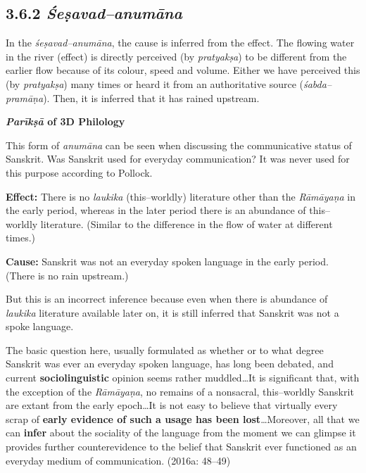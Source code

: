 
\vspace{-.3cm}

\subsection*{3.6.2 {\it {\bfseries Śeṣavad–anumāna}}}

\vspace{-.3cm}

In the \textit{śeṣavad–anumāna}, the cause is inferred from the effect. The flowing water in the river (effect) is directly perceived (by \textit{pratyakṣa}) to be different from the earlier flow because of its colour, speed and volume. Either we have perceived this (by \textit{pratyakṣa}) many times or heard it from an authoritative source (\textit{śabda–pramāṇa}). Then, it is inferred that it has rained upstream.

\textbf{\textit{Parīkṣā} of 3D Philology}

This form of \textit{anumāna} can be seen when discussing the communicative status of Sanskrit. Was Sanskrit used for everyday communication? It was never used for this purpose according to Pollock.

\textbf{Effect:} There is no \textit{laukika} (this–worldly) literature other than the \textit{Rāmāyaṇa }in the early period, whereas in the later period there is an abundance of this–worldly literature. (Similar to the difference in the flow of water at different times.)

\textbf{Cause:} Sanskrit was not an everyday spoken language in the early period. (There is no rain upstream.)

But this is an incorrect inference because even when there is abundance of \textit{laukika} literature available later on, it is still inferred that Sanskrit was not a spoke language.

\begin{myquote}
The basic question here, usually formulated as whether or to what degree Sanskrit was ever an everyday spoken language, has long been debated, and current \textbf{sociolinguistic} opinion seems rather muddled…It is signiﬁcant that, with the exception of the \textit{Rāmāyaṇa}, no remains of a nonsacral, this–worldly Sanskrit are extant from the early epoch…It is not easy to believe that virtually every scrap of \textbf{early evidence of such a usage has been lost}…Moreover, all that we can \textbf{infer} about the sociality of the language from the moment we can glimpse it provides further counterevidence to the belief that Sanskrit ever functioned as an everyday medium of communication. (2016a: 48–49)
\end{myquote}

